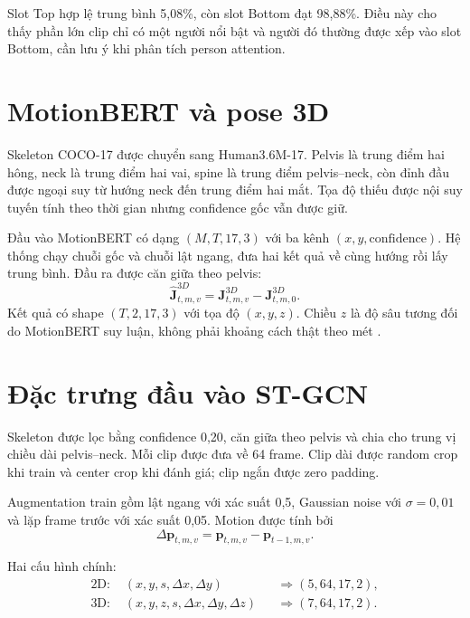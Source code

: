 \documentclass[12pt,a4paper,oneside]{report}
\newcommand{\vect}[1]{\boldsymbol{#1}}
\begin{document}
Slot Top hợp lệ trung bình 5,08\%, còn slot Bottom đạt 98,88\%. Điều này cho thấy phần lớn clip chỉ có một người nổi bật và người đó thường được xếp vào slot Bottom, cần lưu ý khi phân tích person attention.

\section{MotionBERT và pose 3D}

Skeleton COCO-17 được chuyển sang Human3.6M-17. Pelvis là trung điểm hai hông, neck là trung điểm hai vai, spine là trung điểm pelvis--neck, còn đỉnh đầu được ngoại suy từ hướng neck đến trung điểm hai mắt. Tọa độ thiếu được nội suy tuyến tính theo thời gian nhưng confidence gốc vẫn được giữ.

Đầu vào MotionBERT có dạng $(M,T,17,3)$ với ba kênh $(x,y,\text{confidence})$. Hệ thống chạy chuỗi gốc và chuỗi lật ngang, đưa hai kết quả về cùng hướng rồi lấy trung bình. Đầu ra được căn giữa theo pelvis:
\begin{equation}
\hat{\vect{J}}^{3D}_{t,m,v}
=\vect{J}^{3D}_{t,m,v}-\vect{J}^{3D}_{t,m,0}.
\end{equation}
Kết quả có shape $(T,2,17,3)$ với tọa độ $(x,y,z)$. Chiều $z$ là độ sâu tương đối do MotionBERT suy luận, không phải khoảng cách thật theo mét \cite{motionbert}.

\section{Đặc trưng đầu vào ST-GCN}

Skeleton được lọc bằng confidence 0,20, căn giữa theo pelvis và chia cho trung vị chiều dài pelvis--neck. Mỗi clip được đưa về 64 frame. Clip dài được random crop khi train và center crop khi đánh giá; clip ngắn được zero padding.

Augmentation train gồm lật ngang với xác suất 0,5, Gaussian noise với $\sigma=0,01$ và lặp frame trước với xác suất 0,05. Motion được tính bởi
\begin{equation}
\Delta\vect{p}_{t,m,v}=\vect{p}_{t,m,v}-\vect{p}_{t-1,m,v}.
\end{equation}

Hai cấu hình chính:
\begin{align}
\text{2D: }&(x,y,s,\Delta x,\Delta y) &&\Rightarrow (5,64,17,2),\\
\text{3D: }&(x,y,z,s,\Delta x,\Delta y,\Delta z) &&\Rightarrow (7,64,17,2).
\end{align}
\end{document}
